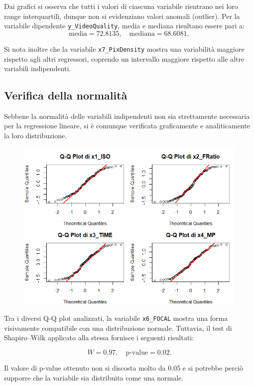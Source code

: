 Dai grafici si osserva che tutti i valori di ciascuna variabile rientrano nei loro range interquartili, dunque non si evidenziano valori anomali (outlier).  
Per la variabile dipendente \texttt{y\_VideoQuality}, media e mediana risultano essere pari a: 
\[
\text{media} = 72.8135, \quad \text{mediana} = 68.6081,
\]
  
Si nota inoltre che la variabile \texttt{x7\_PixDensity} mostra una variabilità maggiore rispetto agli altri regressori, coprendo un intervallo maggiore rispetto alle altre variabili indipendenti.

\subsection{Verifica della normalità}
Sebbene la normalità delle variabili indipendenti non sia strettamente necessaria per la regressione lineare, si è comunque verificata graficamente e analiticamente la loro distribuzione.

\begin{figure}[H]
	\centering
	\includegraphics[width=0.9\linewidth]{graphs/DescriptiveStatisticPlots/qqplot1/qqplot1}
	\label{fig:qqplot1}
\end{figure}

Tra i diversi Q-Q plot analizzati, la variabile \texttt{x6\_FOCAL} mostra una forma visivamente compatibile con una distribuzione normale. Tuttavia, il test di Shapiro–Wilk applicato alla stessa fornisce i seguenti risultati:

\[
W = 0.97, \quad \text{p-value} = 0.02.
\]

Il valore di p-value ottenuto non si discosta molto da 0.05 e si potrebbe perciò supporre che la variabile sia distribuita come una normale.

